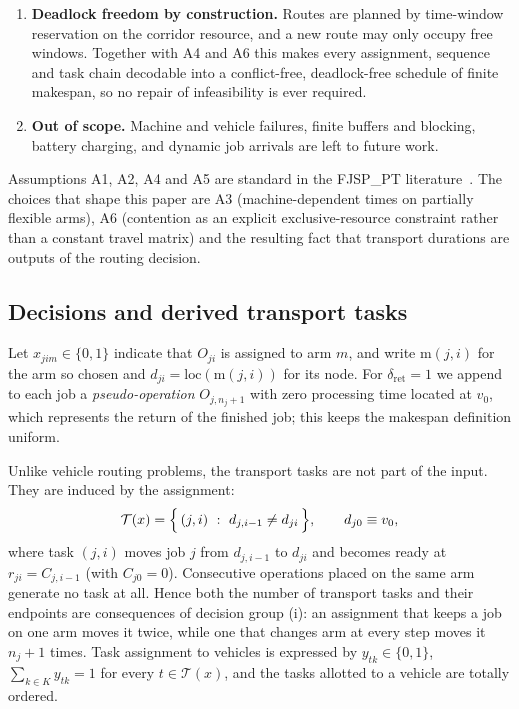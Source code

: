 \documentclass[manuscript,screen,review]{acmart}
\begin{document}
\begin{enumerate}[label=\textbf{A\arabic*.},leftmargin=*,topsep=2pt,itemsep=2pt]
\item \textbf{Deadlock freedom by construction.} Routes are planned by
time-window reservation on the corridor resource, and a new route may only
occupy free windows. Together with A4 and A6 this makes every assignment,
sequence and task chain decodable into a conflict-free, deadlock-free schedule
of finite makespan, so no repair of infeasibility is ever required.

\item \textbf{Out of scope.} Machine and vehicle failures, finite buffers and
blocking, battery charging, and dynamic job arrivals are left to future work.
\end{enumerate}

Assumptions A1, A2, A4 and A5 are standard in the FJSP\_PT
literature~\cite{xin2025review}. The choices that shape this paper are A3
(machine-dependent times on partially flexible arms), A6 (contention as an
explicit exclusive-resource constraint rather than a constant travel matrix) and
the resulting fact that transport durations are outputs of the routing decision.

\subsection{Decisions and derived transport tasks}

Let $x_{jim}\in\{0,1\}$ indicate that $O_{ji}$ is assigned to arm $m$, and write
$\mathrm{m}(j,i)$ for the arm so chosen and $d_{ji}=\mathrm{loc}(\mathrm{m}(j,i))$
for its node. For $\delta_{\mathrm{ret}}=1$ we append to each job a
\emph{pseudo-operation} $O_{j,n_j+1}$ with zero processing time located at
$v_0$, which represents the return of the finished job; this keeps the makespan
definition uniform.

Unlike vehicle routing problems, the transport tasks are not part of the input.
They are induced by the assignment:
\begin{equation}
\label{eq:tasks}
\mathcal{T}(x)=\Bigl\{\,(j,i)\ :\ d_{j,i-1}\neq d_{ji}\,\Bigr\},
\qquad d_{j0}\equiv v_0 ,
\end{equation}
where task $(j,i)$ moves job $j$ from $d_{j,i-1}$ to $d_{ji}$ and becomes ready
at $r_{ji}=C_{j,i-1}$ (with $C_{j0}=0$). Consecutive operations placed on the
same arm generate no task at all. Hence both the number of transport tasks and
their endpoints are consequences of decision group (i): an assignment that keeps
a job on one arm moves it twice, while one that changes arm at every step moves
it $n_j+1$ times. Task assignment to vehicles is expressed by
$y_{tk}\in\{0,1\}$, $\sum_{k\in K}y_{tk}=1$ for every $t\in\mathcal{T}(x)$, and
the tasks allotted to a vehicle are totally ordered.
\end{document}
